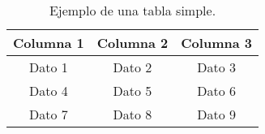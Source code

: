 \begin{table}[h]
    \centering
    \begin{tabular}{|c|c|c|}
        \hline
        Columna 1 & Columna 2 & Columna 3 \\
        \hline
        Dato 1 & Dato 2 & Dato 3 \\
        Dato 4 & Dato 5 & Dato 6 \\
        Dato 7 & Dato 8 & Dato 9 \\
        \hline
    \end{tabular}
    \caption{Ejemplo de una tabla simple.}
    \label{tab:table1}
\end{table}
